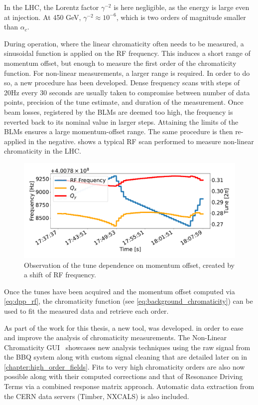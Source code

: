 In the LHC, the Lorentz factor $\gamma^{-2}$ is here negligible, as the energy is large even at
injection.  At 450 GeV, $\gamma^{-2} \approx 10^{-6}$, which is two orders of magnitude smaller than
$\alpha_c$.

During operation, where the linear chromaticity often needs to be measured, a sinusoidal function is
applied on the RF frequency. This induces a short range of momentum offset, but enough to measure
the first order of the chromaticity function.
For non-linear measurements, a larger range is required. In order to do so, a new procedure has been
developed. Dense frequency scans with steps of 20Hz every 30 seconds are usually taken to compromise
between number of data points, precision of the tune estimate, and duration of the measurement. Once
beam losses, registered by the BLMs are deemed too high, the frequency is reverted back to its
nominal value in larger steps. Attaining the limits of the BLMs ensures a large momentum-offset
range. The same procedure is then re-applied in the negative.  shows
a typical RF scan performed to measure non-linear chromaticity in the LHC.

\begin{figure}[H]
    \centering
    \includegraphics[width=1\textwidth]{images/rf_scan.pdf}
    \caption{Observation of the tune dependence on momentum offset, created by a shift of RF
             frequency.}
    \label{fig:measurements:rf_scan}
\end{figure}



Once the tunes have been acquired and the momentum offset computed via \cref{eq:dpp_rf}, the
chromaticity function (see \cref{eq:background_chromaticity}) can be used to fit the
measured data and retrieve each order.

As part of the work for this thesis, a new tool, was developed. in order to ease and improve the
analysis of chromaticity measurements. 
The Non-Linear Chromaticity GUI~\cite{m_le_garrec_non-linear_2022} showcases new analysis techniques
using the raw signal from the BBQ system along with custom signal cleaning that are detailed later
on in \cref{chapter:high_order_fields}. Fits to very high chromaticity orders are also now possible
along with their computed corrections and that of Resonance Driving Terms via a combined response
matrix approach. Automatic data extraction from the CERN data servers (Timber, NXCALS) is also
included.

